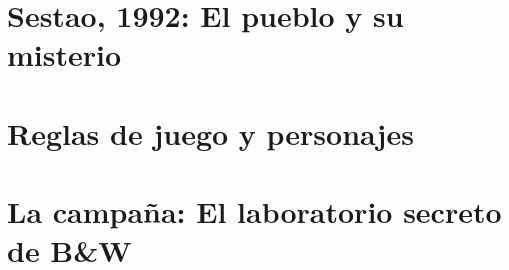 \documentclass[10pt,a5paper,oneside]{book}
\begin{document}
\frontmatter

\tableofcontents

\mainmatter

\part{Sestao, 1992: El pueblo y su misterio}





\part{Reglas de juego y personajes}




\part{La campaña: El laboratorio secreto de B\&W}


\end{document}
